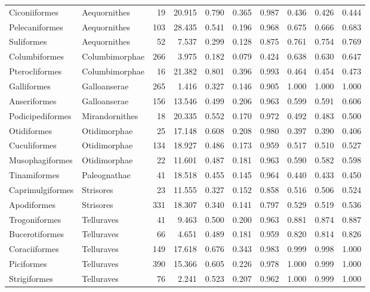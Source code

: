 \begin{table}[ht]
\begin{tabular}{llrrrrrrrr}
  Ciconiiformes & Aequornithes &   19 & 20.915 & 0.790 & 0.365 & 0.987 & 0.436 & 0.426 & 0.444 \\ 
  Pelecaniformes & Aequornithes &  103 & 28.435 & 0.541 & 0.196 & 0.968 & 0.675 & 0.666 & 0.683 \\ 
  Suliformes & Aequornithes &   52 & 7.537 & 0.299 & 0.128 & 0.875 & 0.761 & 0.754 & 0.769 \\ 
  Columbiformes & Columbimorphae &  266 & 3.975 & 0.182 & 0.079 & 0.424 & 0.638 & 0.630 & 0.647 \\ 
  Pterocliformes & Columbimorphae &   16 & 21.382 & 0.801 & 0.396 & 0.993 & 0.464 & 0.454 & 0.473 \\ 
  Galliformes & Galloanserae &  265 & 1.416 & 0.327 & 0.146 & 0.905 & 1.000 & 1.000 & 1.000 \\ 
  Anseriformes & Galloanserae &  156 & 13.546 & 0.499 & 0.206 & 0.963 & 0.599 & 0.591 & 0.606 \\ 
  Podicipediformes & Mirandornithes &   18 & 20.335 & 0.552 & 0.170 & 0.972 & 0.492 & 0.483 & 0.500 \\ 
  Otidiformes & Otidimorphae &   25 & 17.148 & 0.608 & 0.208 & 0.980 & 0.397 & 0.390 & 0.406 \\ 
  Cuculiformes & Otidimorphae &  134 & 18.927 & 0.486 & 0.173 & 0.959 & 0.517 & 0.510 & 0.527 \\ 
  Musophagiformes & Otidimorphae &   22 & 11.601 & 0.487 & 0.181 & 0.963 & 0.590 & 0.582 & 0.598 \\ 
  Tinamiformes & Paleognathae &   41 & 18.518 & 0.455 & 0.145 & 0.964 & 0.440 & 0.433 & 0.450 \\ 
  Caprimulgiformes & Strisores &   23 & 11.555 & 0.327 & 0.152 & 0.858 & 0.516 & 0.506 & 0.524 \\ 
  Apodiformes & Strisores &  331 & 18.307 & 0.340 & 0.141 & 0.797 & 0.529 & 0.519 & 0.536 \\ 
  Trogoniformes & Telluraves &   41 & 9.463 & 0.500 & 0.200 & 0.963 & 0.881 & 0.874 & 0.887 \\ 
  Bucerotiformes & Telluraves &   66 & 4.651 & 0.489 & 0.181 & 0.959 & 0.820 & 0.814 & 0.826 \\ 
  Coraciiformes & Telluraves &  149 & 17.618 & 0.676 & 0.343 & 0.983 & 0.999 & 0.998 & 1.000 \\ 
  Piciformes & Telluraves &  390 & 15.366 & 0.605 & 0.226 & 0.978 & 1.000 & 0.999 & 1.000 \\ 
  Strigiformes & Telluraves &   76 & 2.241 & 0.523 & 0.207 & 0.962 & 1.000 & 0.999 & 1.000 \\ 

\end{tabular}
\end{table}
